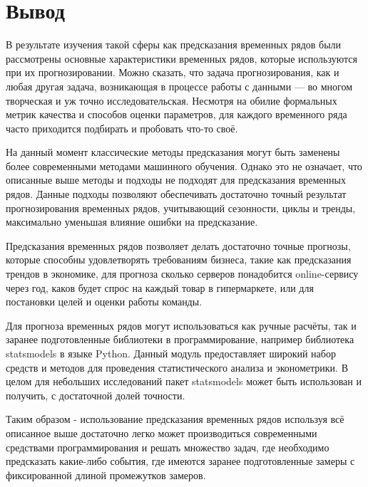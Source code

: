 \section{Вывод}
\label{sec:conclusion}

В результате изучения такой сферы как предсказания временных рядов были рассмотрены основные характеристики временных рядов, которые используются при их прогнозировании. Можно сказать, что задача прогнозирования, как и любая другая задача, возникающая в процессе работы с данными — во многом творческая и уж точно исследовательская. Несмотря на обилие формальных метрик качества и способов оценки параметров, для каждого временного ряда часто приходится подбирать и пробовать что-то своё.

На данный момент классические методы предсказания могут быть заменены более современными методами машинного обучения. Однако это не означает, что описанные выше методы и подходы не подходят для предсказания временных рядов. Данные подходы позволяют обеспечивать достаточно точный результат прогнозирования временных рядов, учитывающий сезонности, циклы и тренды, максимально уменьшая влияние ошибки на предсказание.

Предсказания временных рядов позволяет делать достаточно точные прогнозы, которые способны удовлетворять требованиям бизнеса, такие как предсказания трендов в экономике, для прогноза сколько серверов понадобится online-сервису через год, каков будет спрос на каждый товар в гипермаркете, или для постановки целей и оценки работы команды.

Для прогноза временных рядов могут использоваться как ручные расчёты, так и заранее подготовленные библиотеки в программирование, например библиотека statsmodels в языке Python. Данный модуль предоставляет широкий набор средств и методов для проведения статистического анализа и эконометрики. В целом для небольших исследований пакет statsmodels может быть использован и получить, с достаточной долей точности.

Таким образом - использование предсказания временных рядов используя всё описанное выше достаточно легко может производиться современными средствами программирования и решать множество задач, где необходимо предсказать какие-либо события, где имеются заранее подготовленные замеры с фиксированной длиной промежутков замеров.

